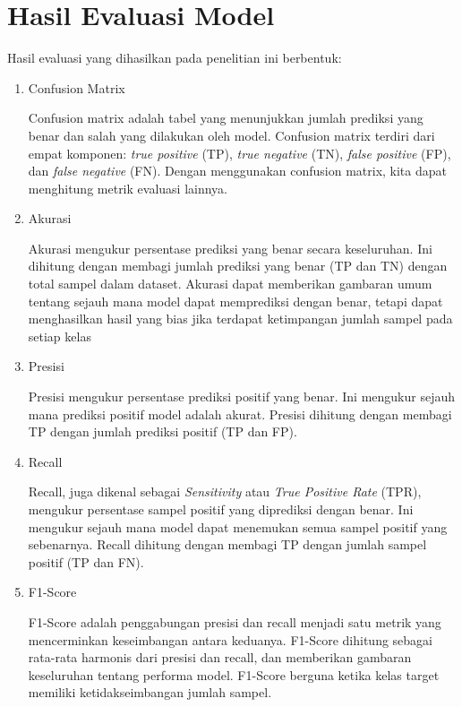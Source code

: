\section{Hasil Evaluasi Model}
Hasil evaluasi yang dihasilkan pada penelitian ini berbentuk:
\begin{enumerate}[nolistsep]
  \item Confusion Matrix

        Confusion matrix adalah tabel yang menunjukkan jumlah prediksi yang benar dan salah yang dilakukan oleh
        model. Confusion matrix terdiri dari empat komponen: \emph{true positive} (TP), \emph{true negative} (TN), \emph{false
        positive} (FP), dan \emph{false negative} (FN). Dengan menggunakan confusion matrix, kita dapat menghitung
        metrik evaluasi lainnya.

  \item Akurasi

        Akurasi mengukur persentase prediksi yang benar secara keseluruhan. Ini dihitung dengan membagi jumlah
        prediksi yang benar (TP dan TN) dengan total sampel dalam dataset. Akurasi dapat memberikan gambaran
        umum tentang sejauh mana model dapat memprediksi dengan benar, tetapi dapat menghasilkan hasil yang
        bias jika terdapat ketimpangan jumlah sampel pada setiap kelas

  \item Presisi

        Presisi mengukur persentase prediksi positif yang benar. Ini mengukur sejauh mana prediksi positif
        model adalah akurat. Presisi dihitung dengan membagi TP dengan jumlah prediksi positif (TP dan FP).

  \item Recall

        Recall, juga dikenal sebagai \emph{Sensitivity} atau \emph{True Positive Rate} (TPR), mengukur persentase sampel
        positif yang diprediksi dengan benar. Ini mengukur sejauh mana model dapat menemukan semua sampel
        positif yang sebenarnya. Recall dihitung dengan membagi TP dengan jumlah sampel positif (TP dan FN).

  \item F1-Score

        F1-Score adalah penggabungan presisi dan recall menjadi satu metrik yang mencerminkan keseimbangan
        antara keduanya. F1-Score dihitung sebagai rata-rata harmonis dari presisi dan recall, dan memberikan
        gambaran keseluruhan tentang performa model. F1-Score berguna ketika kelas target memiliki
        ketidakseimbangan jumlah sampel.

\end{enumerate}

